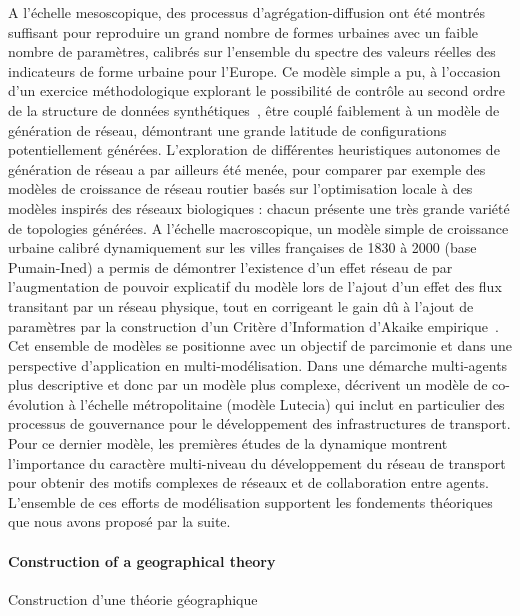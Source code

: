 A l'échelle mesoscopique, des processus d'agrégation-diffusion ont été montrés suffisant pour reproduire un grand nombre de formes urbaines avec un faible nombre de paramètres, calibrés sur l'ensemble du spectre des valeurs réelles des indicateurs de forme urbaine pour l'Europe. Ce modèle simple a pu, à l'occasion d'un exercice méthodologique explorant le possibilité de contrôle au second ordre de la structure de données synthétiques~\cite{raimbault2016generation}, être couplé faiblement à un modèle de génération de réseau, démontrant une grande latitude de configurations potentiellement générées. L'exploration de différentes heuristiques autonomes de génération de réseau a par ailleurs été menée, pour comparer par exemple des modèles de croissance de réseau routier basés sur l'optimisation locale à des modèles inspirés des réseaux biologiques : chacun présente une très grande variété de topologies générées. A l'échelle macroscopique, un modèle simple de croissance urbaine calibré dynamiquement sur les villes françaises de 1830 à 2000 (base Pumain-Ined) a permis de démontrer l'existence d'un effet réseau de par l'augmentation de pouvoir explicatif du modèle lors de l'ajout d'un effet des flux transitant par un réseau physique, tout en corrigeant le gain dû à l'ajout de paramètres par la construction d'un Critère d'Information d'Akaike empirique~\cite{raimbault2016models}. Cet ensemble de modèles se positionne avec un objectif de parcimonie et dans une perspective d'application en multi-modélisation. Dans une démarche multi-agents plus descriptive et donc par un modèle plus complexe, \cite{le2015modeling} décrivent un modèle de co-évolution à l'échelle métropolitaine (modèle Lutecia) qui inclut en particulier des processus de gouvernance pour le développement des infrastructures de transport. Pour ce dernier modèle, les premières études de la dynamique montrent l'importance du caractère multi-niveau du développement du réseau de transport pour obtenir des motifs complexes de réseaux et de collaboration entre agents. L'ensemble de ces efforts de modélisation supportent les fondements théoriques que nous avons proposé par la suite.



\paragraph{Construction of a geographical theory}{Construction d'une théorie géographique}

